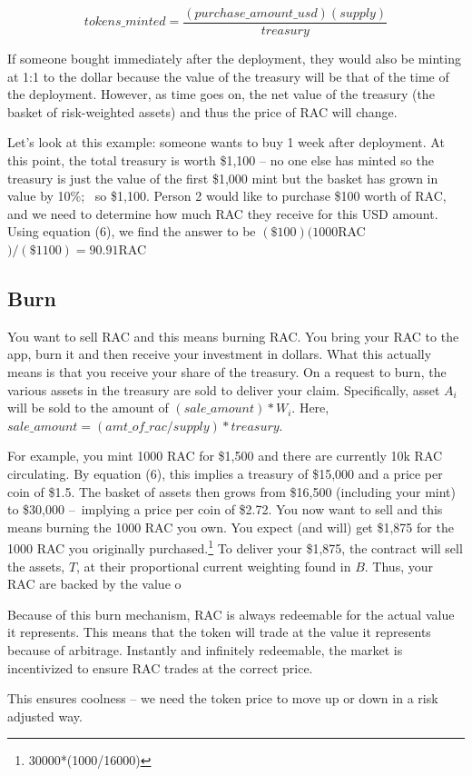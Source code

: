\documentclass[11pt]{article}
\begin{document}
\begin{equation}
tokens\_minted = \frac{(purchase\_amount\_usd)(supply)}{treasury}	
\end{equation}

If someone bought immediately after the deployment, they would also be minting at 1:1 to the dollar because the value of the treasury will be that of the time of the deployment. However, as time goes on, the net value of the treasury (the basket of risk-weighted assets) and thus the price of RAC will change. 

Let's look at this example: someone wants to buy 1 week after deployment. At this point, the total treasury is worth \$1,100 -- no one else has minted so the treasury is just the value of the first \$1,000 mint but the basket has grown in value by 10\%;  so \$1,100. Person 2 would like to purchase \$100 worth of RAC, and we need to determine how much RAC they receive for this USD amount. Using equation (6), we find the answer to be $(\$100)(1000 $RAC$)/(\$1100) = 90.91 $RAC

\subsection{Burn}

You want to sell RAC and this means burning RAC. You bring your RAC to the app, burn it and then receive your investment in dollars. What this actually means is that you receive your share of the treasury. On a request to burn, the various assets in the treasury are sold to deliver your claim. Specifically, asset $A_i$ will be sold to the amount of $(sale\_amount)*W_i$. Here, $sale\_amount = (amt\_of\_rac /supply)*treasury$. 

For example, you mint 1000 RAC for \$1,500 and there are currently 10k RAC circulating. By equation (6), this implies a treasury of \$15,000 and a price per coin of \$1.5. The basket of assets then grows from \$16,500 (including your mint) to \$30,000 – implying a price per coin of \$2.72. You now want to sell and this means burning the 1000 RAC you own. You expect (and will) get \$1,875 for the 1000 RAC you originally purchased.\footnote{30000*(1000/16000)} To deliver your \$1,875, the contract will sell the assets, $T$, at their proportional current weighting found in $B$. Thus, your RAC are backed by the value o

Because of this burn mechanism, RAC is always redeemable for the actual value it represents. This means that the token will trade at the value it represents because of arbitrage. Instantly and infinitely redeemable, the market is incentivized to ensure RAC trades at the correct price. 

This ensures coolness -- we need the token price to move up or down in a risk adjusted way.  
\end{document}

